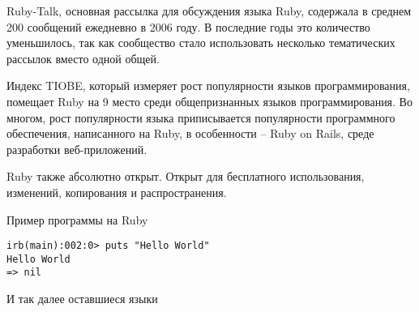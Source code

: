 \documentclass[14pt]{beamer}
\begin{document}
\begin{frame}
\begin{block}

Ruby-Talk, основная рассылка для обсуждения языка Ruby, содержала в среднем 200 сообщений ежедневно в 2006 году. В последние годы это количество уменьшилось, так как сообщество стало использовать несколько тематических рассылок вместо одной общей.
\end{block}
\end{frame}

\begin{frame}
\begin{block}

Индекс TIOBE, который измеряет рост популярности языков программирования, помещает Ruby на 9 место среди общепризнанных языков программирования. Во многом, рост популярности языка приписывается популярности программного обеспечения, написанного на Ruby, в особенности – Ruby on Rails, среде разработки веб-приложений.
\end{block}
\end{frame}

\begin{frame}
\begin{block}

Ruby также абсолютно открыт. Открыт для бесплатного использования, изменений, копирования и распространения.
\end{block}
\end{frame}

\begin{frame}[fragile]
\begin{block}{Пример программы на Ruby}

\begin{lstlisting}
irb(main):002:0> puts "Hello World"
Hello World
=> nil
\end{lstlisting}
\end{block}
\end{frame}

\begin{frame}
И так далее оставшиеся языки
\end{frame}
\end{document}
